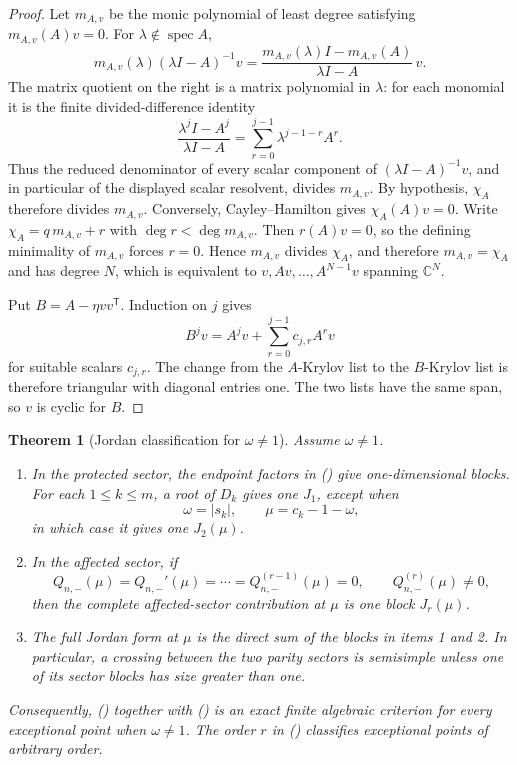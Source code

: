 \documentclass[twoside,10pt]{article}
\numberwithin{equation}{section}
\theoremstyle{slbody}
\newtheorem{theorem}{Theorem}[section]
\theoremstyle{definition}
\theoremstyle{remark}
\newcommand{\spec}{\operatorname{spec}}
\renewcommand{\eqref}[1]{%
  \textup{{\normalfont(\oldstylenums{\ref{#1}}}\normalfont)}}
\begin{document}
\begin{proof}
Let $m_{A,v}$ be the monic polynomial of least degree satisfying
$m_{A,v}(A)v=0$.  For $\lambda\notin\spec A$,
\begin{equation}\label{eq:vector-minimal-resolvent}
 m_{A,v}(\lambda)(\lambda I-A)^{-1}v
 =\frac{m_{A,v}(\lambda)I-m_{A,v}(A)}{\lambda I-A}\,v.
\end{equation}
The matrix quotient on the right is a matrix polynomial in $\lambda$:
for each monomial it is the finite divided-difference identity
\[
 \frac{\lambda^jI-A^j}{\lambda I-A}
   =\sum_{r=0}^{j-1}\lambda^{j-1-r}A^r.
\]
Thus the reduced denominator of every scalar component of
$(\lambda I-A)^{-1}v$, and in particular of the displayed scalar
resolvent, divides $m_{A,v}$.  By hypothesis, $\chi_A$ therefore
divides $m_{A,v}$.  Conversely, Cayley--Hamilton gives
$\chi_A(A)v=0$.  Write $\chi_A=q\,m_{A,v}+r$ with
$\deg r<\deg m_{A,v}$.  Then $r(A)v=0$, so the defining minimality of
$m_{A,v}$ forces $r=0$.  Hence $m_{A,v}$ divides $\chi_A$, and therefore
$m_{A,v}=\chi_A$ and has degree $N$, which is equivalent to
$v,Av,\ldots,A^{N-1}v$ spanning $\mathbb C^N$.

Put $B=A-\eta vv^{\mathsf T}$.  Induction on $j$ gives
\[
 B^jv=A^jv+\sum_{r=0}^{j-1}c_{j,r}A^rv
\]
for suitable scalars $c_{j,r}$.  The change from the $A$-Krylov list
to the $B$-Krylov list is therefore triangular with diagonal entries
one.  The two lists have the same span, so $v$ is cyclic for $B$.
\end{proof}

\begin{theorem}[Jordan classification for $\omega\ne1$]
\label{thm:jordan-regular}
Assume $\omega\ne1$.
\begin{enumerate}
\item In the protected sector, the endpoint factors in
  \eqref{eq:Hplus} give one-dimensional blocks.  For each
  $1\leq k\leq m$, a root of $D_k$ gives one $J_1$, except when
  \begin{equation}\label{eq:protected-ep}
    \omega=|s_k|,\qquad
    \mu=c_k-1-\omega,
  \end{equation}
  in which case it gives one $J_2(\mu)$.
\item In the affected sector, if
  \begin{equation}\label{eq:affected-ep}
    Q_{n,-}(\mu)=Q_{n,-}'(\mu)=\cdots
      =Q_{n,-}^{(r-1)}(\mu)=0,\qquad
    Q_{n,-}^{(r)}(\mu)\ne0,
  \end{equation}
  then the complete affected-sector contribution at $\mu$ is one
  block $J_r(\mu)$.
\item The full Jordan form at $\mu$ is the direct sum of the blocks in
  items 1 and 2.  In particular, a crossing between the two parity
  sectors is semisimple unless one of its sector blocks has size greater
  than one.
\end{enumerate}
Consequently, \eqref{eq:protected-ep} together with
\eqref{eq:affected-ep} is an exact finite algebraic criterion for every
exceptional point when $\omega\ne1$.  The order $r$ in \eqref{eq:affected-ep}
classifies exceptional points of arbitrary order.
\end{theorem}
\end{document}

